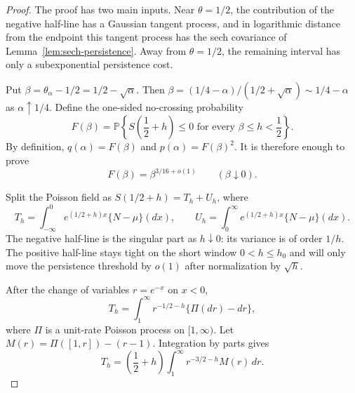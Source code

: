 \begin{proof}
The proof has two main inputs. Near \(\theta=1/2\), the contribution of the
negative half-line has a Gaussian tangent process, and in logarithmic distance
from the endpoint this tangent process has the sech covariance of
Lemma~\ref{lem:sech-persistence}. Away from \(\theta=1/2\), the remaining
interval has only a subexponential persistence cost.

Put $\beta=\theta_\alpha-1/2=1/2-\sqrt\alpha$. Then $\beta=(1/4-\alpha)/(1/2+\sqrt\alpha)\sim1/4-\alpha$ as $\alpha\uparrow1/4$. Define the one-sided no-crossing probability
\[
    F(\beta)
    =
    \mathbb P\left\{
        S\left(\frac12+h\right)\le0
        \text{ for every }\beta\le h<\frac12
    \right\}.
\]
By definition, $q(\alpha)=F(\beta)$ and $p(\alpha)=F(\beta)^2$. It is therefore enough to prove
\begin{equation}
\label{eq:F-beta-persistence}
    F(\beta)=\beta^{3/16+o(1)}
    \qquad(\beta\downarrow0).
\end{equation}

Split the Poisson field as $S(1/2+h)=T_h+U_h$, where
\[
    T_h=\int_{-\infty}^0 e^{(1/2+h)x}\{N-\mu\}(dx),
    \qquad
    U_h=\int_0^\infty e^{(1/2+h)x}\{N-\mu\}(dx).
\]
The negative half-line is the singular part as $h\downarrow0$: its variance is
of order $1/h$. The positive half-line stays tight on the short window
$0<h\le h_0$ and will only move the persistence threshold by $o(1)$ after
normalization by $\sqrt h$.

After the change of variables $r=e^{-x}$ on $x<0$,
\[
    T_h
    =
    \int_1^\infty r^{-1/2-h}\{\Pi(dr)-dr\},
\]
where $\Pi$ is a unit-rate Poisson process on $[1,\infty)$. Let $M(r)=\Pi([1,r])-(r-1)$. Integration by parts gives
\[
    T_h
    =
    \left(\frac12+h\right)
    \int_1^\infty r^{-3/2-h}M(r)\,dr.
\]


\end{proof}

